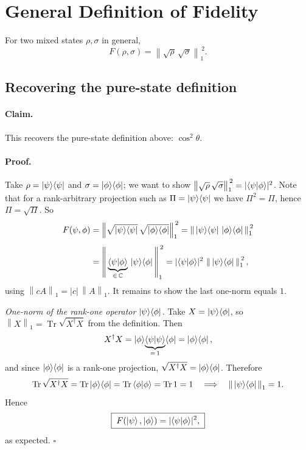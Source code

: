 \documentclass[11pt]{article}
\newcommand{\Tr}{\operatorname{Tr}}
\newcommand{\onenorm}[1]{\left\lVert #1 \right\rVert_{1}}
\newcommand{\C}{\mathbb{C}}
\begin{document}
\section{General Definition of Fidelity}

For two mixed states $\rho,\sigma$ in general,
\[
\boxed{\; F(\rho,\sigma) = \onenorm{\sqrt{\rho}\,\sqrt{\sigma}}^{\,2}. \;}
\]

\subsection{Recovering the pure-state definition}

\paragraph{Claim.}
This recovers the pure-state definition above: $\cos^{2}\theta$.

\paragraph{Proof.}
Take $\rho=\ket{\psi}\!\bra{\psi}$ and $\sigma=\ket{\phi}\!\bra{\phi}$; we want
to show $\onenorm{\sqrt{\rho}\,\sqrt{\sigma}}^{\,2} = |\!\braket{\psi|\phi}\!|^{2}$.
Note that for a rank-arbitrary projection such as $\Pi=\ket{\psi}\!\bra{\psi}$
we have $\Pi^{2}=\Pi$, hence $\Pi=\sqrt{\Pi}$. So
\begin{align*}
F(\psi,\phi)
&= \onenorm{\sqrt{\ket{\psi}\!\bra{\psi}}\,\sqrt{\ket{\phi}\!\bra{\phi}}}^{\,2}
= \onenorm{\,\ket{\psi}\!\bra{\psi}\,\ket{\phi}\!\bra{\phi}\,}^{\,2}\\[4pt]
&= \onenorm{\,\underbrace{\braket{\psi|\phi}}_{\in\,\C}\,\ket{\psi}\!\bra{\phi}\,}^{\,2}
= |\!\braket{\psi|\phi}\!|^{2}\,\onenorm{\,\ket{\psi}\!\bra{\phi}\,}^{\,2},
\end{align*}
using $\onenorm{cA} = |c|\,\onenorm{A}$. It remains to show the last one-norm
equals $1$.

\medskip
\noindent\emph{One-norm of the rank-one operator $\ket{\psi}\!\bra{\phi}$.}
Take $X=\ket{\psi}\!\bra{\phi}$, so $\onenorm{X}=\Tr\sqrt{X^{\dagger}X}$ from
the definition. Then
\[
X^{\dagger}X = \ket{\phi}\!\underbrace{\braket{\psi|\psi}}_{=\,1}\!\bra{\phi}
= \ket{\phi}\!\bra{\phi},
\]
and since $\ket{\phi}\!\bra{\phi}$ is a rank-one projection,
$\sqrt{X^{\dagger}X}=\ket{\phi}\!\bra{\phi}$. Therefore
\[
\Tr\sqrt{X^{\dagger}X} = \Tr\ket{\phi}\!\bra{\phi} = \Tr\braket{\phi|\phi}
= \Tr 1 = 1
\quad\Longrightarrow\quad
\onenorm{\,\ket{\psi}\!\bra{\phi}\,} = 1.
\]
Hence
\[
\boxed{\; F(\ket{\psi},\ket{\phi}) = |\!\braket{\psi|\phi}\!|^{2}, \;}
\]
as expected. \hfill$\square$
\end{document}
